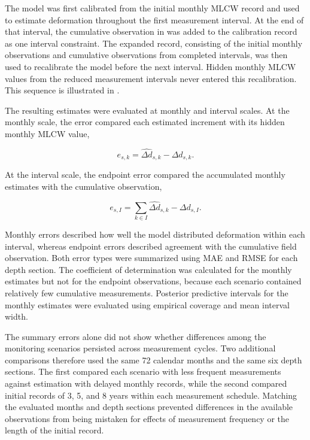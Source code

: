 The model was first calibrated from the initial monthly MLCW record and used to estimate deformation throughout the first measurement interval. At the end of that interval, the cumulative observation in  was added to the calibration record as one interval constraint. The expanded record, consisting of the initial monthly observations and cumulative observations from completed intervals, was then used to recalibrate the model before the next interval. Hidden monthly MLCW values from the reduced measurement intervals never entered this recalibration. This sequence is illustrated in .

The resulting estimates were evaluated at monthly and interval scales. At the monthly scale, the error compared each estimated increment with its hidden monthly MLCW value,

\begin{equation}
e_{s,k}
=
\widehat{\Delta d}_{s,k}
-
\Delta d_{s,k}.
\label{eq:sparse_monthly_error}
\end{equation}

At the interval scale, the endpoint error compared the accumulated monthly estimates with the cumulative observation,

\begin{equation}
e_{s,I}
=
\sum_{k\in I}\widehat{\Delta d}_{s,k}
-
\Delta d_{s,I}.
\label{eq:sparse_endpoint_error}
\end{equation}

Monthly errors described how well the model distributed deformation within each interval, whereas endpoint errors described agreement with the cumulative field observation. Both error types were summarized using MAE and RMSE for each depth section. The coefficient of determination was calculated for the monthly estimates but not for the endpoint observations, because each scenario contained relatively few cumulative measurements. Posterior predictive intervals for the monthly estimates were evaluated using empirical coverage and mean interval width.

The summary errors alone did not show whether differences among the monitoring scenarios persisted across measurement cycles. Two additional comparisons therefore used the same 72 calendar months and the same six depth sections. The first compared each scenario with less frequent measurements against estimation with delayed monthly records, while the second compared initial records of 3, 5, and 8 years within each measurement schedule. Matching the evaluated months and depth sections prevented differences in the available observations from being mistaken for effects of measurement frequency or the length of the initial record.

